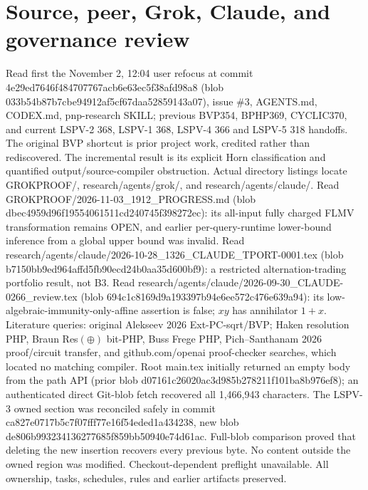 \documentclass[11pt]{article}
\begin{document}
\section*{Source, peer, Grok, Claude, and governance review}
Read first the November 2, 12:04 user refocus at commit 4e29ed7646f484707767acb6e63ec5f38afd98a8 (blob 033b54b87b7cbe94912af5cf67daa52859143a07), issue \#3, AGENTS.md, CODEX.md, pnp-research SKILL; previous BVP354, BPHP369, CYCLIC370, and current LSPV-2 368, LSPV-1 368, LSPV-4 366 and LSPV-5 318 handoffs. The original BVP shortcut is prior project work, credited rather than rediscovered. The incremental result is its explicit Horn classification and quantified output/source-compiler obstruction.
Actual directory listings locate GROKPROOF/, research/agents/grok/, and research/agents/claude/. Read GROKPROOF/2026-11-03_1912_PROGRESS.md (blob dbec4959d96f19554061511cd240745f398272ec): its all-input fully charged FLMV transformation remains OPEN, and earlier per-query-runtime lower-bound inference from a global upper bound was invalid. Read research/agents/claude/2026-10-28_1326_CLAUDE_TPORT-0001.tex (blob b7150bb9ed964affd5fb90ecd24b0aa35d600bf9): a restricted alternation-trading portfolio result, not B3. Read research/agents/claude/2026-09-30_CLAUDE-0266_review.tex (blob 694c1c8169d9a193397b94e6ee572c476e639a94): its low-algebraic-immunity-only-affine assertion is false; $xy$ has annihilator $1+x$.
Literature queries: original Alekseev 2026 Ext-PC-sqrt/BVP; Haken resolution PHP, Braun Res$(\oplus)$ bit-PHP, Buss Frege PHP, Pich--Santhanam 2026 proof/circuit transfer, and github.com/openai proof-checker searches, which located no matching compiler. Root main.tex initially returned an empty body from the path API (prior blob d07161c26020ac3d985b278211f101ba8b976ef8); an authenticated direct Git-blob fetch recovered all 1,466,943 characters. The LSPV-3 owned section was reconciled safely in commit ca827e0717b5c7f07fff77e16f54eded1a434238, new blob de806b993234136277685f859bb50940e74d61ac. Full-blob comparison proved that deleting the new insertion recovers every previous byte. No content outside the owned region was modified. Checkout-dependent preflight unavailable. All ownership, tasks, schedules, rules and earlier artifacts preserved.
\end{document}
